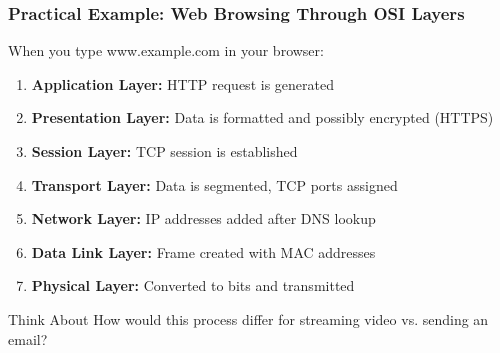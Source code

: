 \documentclass{beamer}
\begin{document}
\begin{frame}
    \frametitle{Practical Example: Web Browsing Through OSI Layers}
    
    \begin{block}{When you type www.example.com in your browser:}
        \begin{enumerate}
            \item \textbf{Application Layer:} HTTP request is generated
            \item \textbf{Presentation Layer:} Data is formatted and possibly encrypted (HTTPS)
            \item \textbf{Session Layer:} TCP session is established
            \item \textbf{Transport Layer:} Data is segmented, TCP ports assigned
            \item \textbf{Network Layer:} IP addresses added after DNS lookup
            \item \textbf{Data Link Layer:} Frame created with MAC addresses
            \item \textbf{Physical Layer:} Converted to bits and transmitted
        \end{enumerate}
    \end{block}
    
    \begin{alertblock}{Think About}
        How would this process differ for streaming video vs. sending an email?
    \end{alertblock}
\end{frame}
\end{document}
